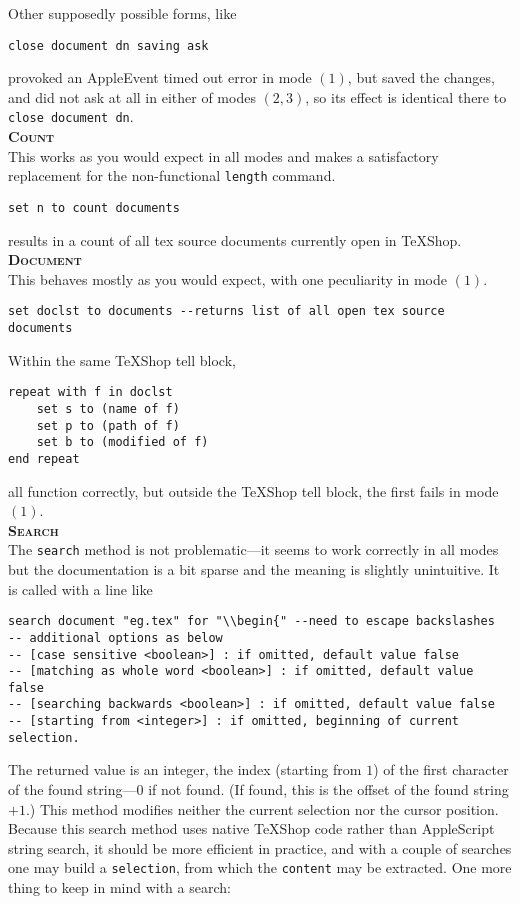 \documentclass[11pt]{amsart}
\def\TeXShop{\TeX Shop\xspace}
\begin{document}
Other supposedly possible forms, like
\begin{verbatim}
close document dn saving ask
\end{verbatim}
provoked an AppleEvent timed out error in mode $(1)$, but saved the changes, and did not ask at all in either of modes $(2,3)$, so its effect is identical there to
\verb|close document dn|.\\[6pt]
\textbf{\textsc{Count}}\\[3pt]
This works as you would expect in all modes and makes a satisfactory replacement for the non-functional {\tt length} command.
\begin{verbatim}
set n to count documents
\end{verbatim}
results in a count of all tex source documents currently open in \TeXShop.\\[3pt]
\textbf{\textsc{Document}}\\[3pt]
This behaves mostly as you would expect, with one peculiarity in mode $(1)$.
\begin{verbatim}
set doclst to documents --returns list of all open tex source documents
\end{verbatim}
Within the same \TeXShop tell block,
\begin{verbatim}
repeat with f in doclst
    set s to (name of f)
    set p to (path of f)
    set b to (modified of f)
end repeat
\end{verbatim}
all function correctly, but outside the \TeXShop tell block, the first fails in mode $(1)$.\\[3pt]
\textbf{\textsc{Search}}\nopagebreak[4]\\[3pt]
The {\tt search} method is not problematic---it seems to work correctly in all modes but the documentation is a bit sparse and the meaning is slightly unintuitive.  It is called with a line like
\begin{verbatim}
search document "eg.tex" for "\\begin{" --need to escape backslashes
-- additional options as below
-- [case sensitive <boolean>] : if omitted, default value false
-- [matching as whole word <boolean>] : if omitted, default value false
-- [searching backwards <boolean>] : if omitted, default value false
-- [starting from <integer>] : if omitted, beginning of current selection.
\end{verbatim}
The returned value is an integer, the index (starting from $1$) of the first character of the found string---$0$ if not found. (If found, this is the offset of the found string $+1$.) This method modifies neither the current selection nor the cursor position. Because this search method uses native \TeXShop code rather than AppleScript string search, it should be more efficient in practice, and with a couple of searches one may build a {\tt selection}, from which the {\tt content} may be extracted. One more thing to keep in mind with a search:
\end{document}
